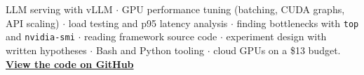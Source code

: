 \documentclass[10pt,a4paper]{article}
\newcommand{\repo}{https://github.com/himanshu1573/qwen-vl-inference-arena}
\begin{document}
\begin{tcolorbox}[colback=soft,colframe=accent,arc=3pt,boxrule=0.6pt,title={\small\bfseries Skills shown in this project}]
\small
LLM serving with vLLM $\cdot$ GPU performance tuning (batching, CUDA graphs, API scaling) $\cdot$ load testing and p95 latency analysis $\cdot$ finding bottlenecks with \texttt{top} and \texttt{nvidia-smi} $\cdot$ reading framework source code $\cdot$ experiment design with written hypotheses $\cdot$ Bash and Python tooling $\cdot$ cloud GPUs on a \$13 budget. \hfill \href{\repo}{\textbf{View the code on GitHub}}
\end{tcolorbox}
\end{document}

